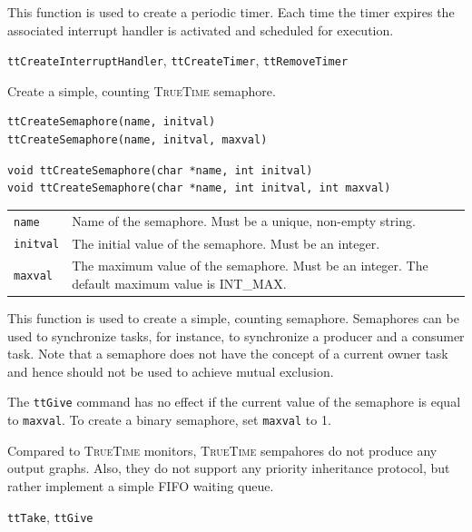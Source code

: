 \documentclass[final,twoside]{rapport}
\begin{document}
\descr This function is used to create a periodic timer. Each time the
timer expires the associated interrupt handler is activated and
scheduled for execution.

\seealso
{\tt ttCreateInterruptHandler}, {\tt ttCreateTimer}, {\tt ttRemoveTimer}



\purpose
Create a simple, counting \textsc{TrueTime} semaphore.

\Msyntax
\begin{verbatim}
ttCreateSemaphore(name, initval)
ttCreateSemaphore(name, initval, maxval)
\end{verbatim}

\Csyntax
\begin{verbatim}
void ttCreateSemaphore(char *name, int initval)
void ttCreateSemaphore(char *name, int initval, int maxval)
\end{verbatim}

\args
\begin{tabularx}{\hsize}{l>{\raggedright\arraybackslash}X}
  {\tt name} & Name of the semaphore. Must be a unique, non-empty string. \\
  {\tt initval} & The initial value of the semaphore. Must be an integer. \\
  {\tt maxval} & The maximum value of the semaphore.  Must be an
  integer. The default
  maximum value is INT\_MAX.
\end{tabularx}

\descr This function is used to create a simple, counting semaphore.
Semaphores can be used to synchronize tasks, for instance, to
synchronize a producer and a consumer task. Note that a semaphore does
not have the concept of a current owner task and hence should not be
used to achieve mutual exclusion.

The {\tt ttGive} command has no effect if the current value of the
semaphore is equal to {\tt maxval}. To create a binary
semaphore, set {\tt maxval} to 1.

Compared to \textsc{TrueTime} monitors, \textsc{TrueTime} sempahores
do not produce any output graphs. Also, they do not support any
priority inheritance protocol, but rather implement a simple FIFO
waiting queue. 

\seealso 
{\tt ttTake}, {\tt ttGive}

\end{document}
